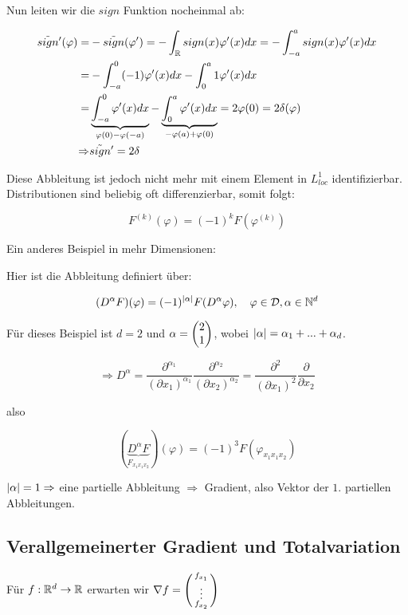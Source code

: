 Nun leiten wir die $sign$ Funktion nocheinmal ab:

\begin{align*}
    \tilde{sign}'(\varphi) =& -\tilde{sign}(\varphi') = - \int_\mathbb R sign(x) \varphi'(x) dx = - \int_{-a}^a sign(x) \varphi'(x) dx\\
    =&- \int_{-a}^0 (-1) \varphi'(x) dx - \int_0^a 1 \varphi'(x)dx\\
    =&\underbrace{\int_{-a}^0 \varphi'(x) dx}_{\varphi(0) - \varphi(-a)} - \underbrace{\int_0^a \varphi'(x)dx}_{-\varphi(a)+\varphi(0)} = 2 \varphi(0) = 2 \delta(\varphi)\\
    \Rightarrow & \tilde{sign}'=2\delta
\end{align*}

Diese Abbleitung ist jedoch nicht mehr mit einem Element in $L^1_{loc}$ identifizierbar.
Distributionen sind beliebig oft differenzierbar, somit folgt:

\[F^{(k)}(\varphi) = (-1)^kF(\varphi^{(k)})\]

Ein anderes Beispiel in mehr Dimensionen:

Hier ist die Abbleitung definiert über:

\[(D^\alpha F)(\varphi) = (-1)^{\left| \alpha \right|}F(D^{\alpha} \varphi), \quad \varphi \in \mathcal{D}, \alpha \in \mathbb N^d\]

Für dieses Beispiel ist $d=2$ und $\alpha = \begin{pmatrix} 2\\1 \end{pmatrix}$, wobei $\left| \alpha \right| = \alpha_1 + ... +\alpha_d$.

\[\Rightarrow D^\alpha = \frac{\partial^{\alpha_1}}{(\partial x_1)^{\alpha_1}}\frac{\partial^{\alpha_2}}{(\partial x_2)^{\alpha_2}} = \frac{\partial^{2}}{(\partial x_1)^{2}} \frac{\partial}{\partial x_2}\]

also

\[(\underbrace{D^\alpha F}_{F_{x_1 x_1 x_2}})(\varphi) = (-1)^{3}F(\varphi_{x_1 x_1 x_2})\]

$\left| \alpha \right|=1 \Rightarrow $ eine partielle Abbleitung $\Rightarrow$ Gradient, also Vektor der $1.$ partiellen Abbleitungen.

\subsection{Verallgemeinerter Gradient und Totalvariation}

Für $f:\mathbb R^d \to \mathbb R$ erwarten wir $\nabla f = \left( \begin{smallmatrix} f_{x_1} \\ \vdots \\ f_{x_2} \end{smallmatrix} \right)$

